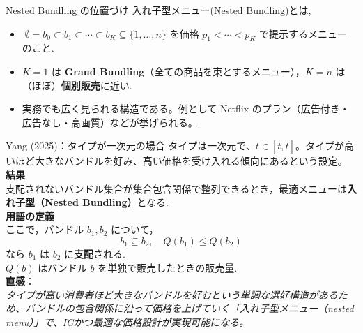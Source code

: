 \documentclass[dvipdfmx,professionalfonts]{beamer} %
\title{\papertitle}
\author{\paperauthor}
\institute{\paperaffil}
\date{\paperdate}
\begin{document}
\begin{frame}
  \titlepage
\end{frame}


\begin{frame}{Nested Bundling の位置づけ}
入れ子型メニュー(Nested Bundling)とは,
\begin{itemize}
    \item $\;\emptyset = b_0 \subset b_1 \subset \cdots \subset b_K \subseteq \{1,\dots,n\}$ を価格 $p_1<\cdots<p_K$ で提示するメニューのこと.
    \item $K{=}1$ は \textbf{Grand Bundling}（全ての商品を束とするメニュー），$K{=}n$ は（ほぼ）\textbf{個別販売}に近い.
    \item 実務でも広く見られる構造である。例として Netflix のプラン（広告付き・広告なし・高画質）などが挙げられる。.
\end{itemize}
\end{frame}

\begin{frame}{Yang (2025)：タイプが一次元の場合}
タイプは一次元で、$t\in[\underline t,\overline t]$。タイプが高いほど大きなバンドルを好み、高い価格を受け入れる傾向にあるという設定。\\[6pt]

\textbf{結果}\\
支配されないバンドル集合が集合包含関係で整列できるとき，最適メニューは\textbf{入れ子型（Nested Bundling）}となる.\\[6pt]

\small
\textbf{用語の定義}\\
ここで，バンドル $b_1,b_2$ について，
\[
b_1\subseteq b_2,\quad Q(b_1)\le Q(b_2)
\]
なら $b_1$ は $b_2$ に\textbf{支配}される.\\
$Q(b)$ はバンドル $b$ を単独で販売したときの販売量.\\[8pt]

\textbf{直感}：\\
\textit{タイプが高い消費者ほど大きなバンドルを好むという単調な選好構造があるため、バンドルの包含関係に沿って価格を上げていく「入れ子型メニュー（nested menu）」で、ICかつ最適な価格設計が実現可能になる。}


\end{frame}
\end{document}
